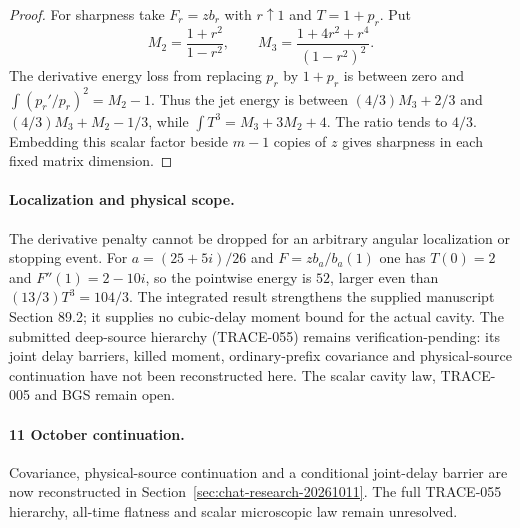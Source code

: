 \begin{proof}
For sharpness take $F_r=zb_r$ with $r\uparrow1$ and $T=1+p_r$.
Put
\[
 M_2=\frac{1+r^2}{1-r^2},\qquad
 M_3=\frac{1+4r^2+r^4}{(1-r^2)^2}.
\]
The derivative energy loss from replacing $p_r$ by $1+p_r$ is between
zero and $\int(p_r'/p_r)^2=M_2-1$. Thus the jet energy is between
$(4/3)M_3+2/3$ and $(4/3)M_3+M_2-1/3$, while
$\int T^3=M_3+3M_2+4$. The ratio tends to $4/3$.
Embedding this scalar factor beside $m-1$ copies of $z$ gives sharpness
in each fixed matrix dimension.
\end{proof}

\paragraph{Localization and physical scope.}
The derivative penalty cannot be dropped for an arbitrary angular
localization or stopping event. For
$a=(25+5i)/26$ and $F=zb_a/b_a(1)$ one has $T(0)=2$ and
$F''(1)=2-10i$, so the pointwise energy is $52$,
larger even than $(13/3)T^3=104/3$.
The integrated result strengthens the supplied manuscript Section 89.2;
it supplies no cubic-delay moment bound for the actual cavity.
The submitted deep-source hierarchy (TRACE-055) remains
verification-pending: its joint delay barriers, killed moment,
ordinary-prefix covariance and physical-source continuation have not been
reconstructed here. The scalar cavity law, TRACE-005 and BGS remain open.

\paragraph{11 October continuation.}
Covariance, physical-source continuation and a conditional joint-delay barrier
are now reconstructed in Section~\ref{sec:chat-research-20261011}.
The full TRACE-055 hierarchy, all-time flatness and scalar microscopic law
remain unresolved.
